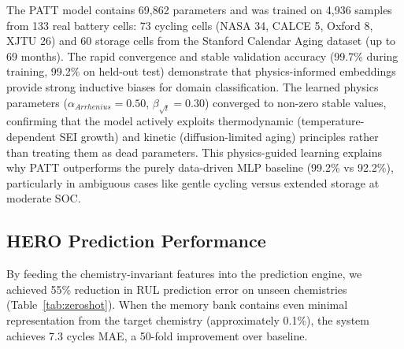 \documentclass[5p,times,authoryear]{elsarticle}
\begin{document}
The PATT model contains 69,862 parameters and was trained on 4,936 samples from 133 real battery cells: 73 cycling cells (NASA 34, CALCE 5, Oxford 8, XJTU 26) and 60 storage cells from the Stanford Calendar Aging dataset (up to 69 months). The rapid convergence and stable validation accuracy (99.7\% during training, 99.2\% on held-out test) demonstrate that physics-informed embeddings provide strong inductive biases for domain classification. The learned physics parameters ($\alpha_{Arrhenius} = 0.50$, $\beta_{\sqrt{t}} = 0.30$) converged to non-zero stable values, confirming that the model actively exploits thermodynamic (temperature-dependent SEI growth) and kinetic (diffusion-limited aging) principles rather than treating them as dead parameters. This physics-guided learning explains why PATT outperforms the purely data-driven MLP baseline (99.2\% vs 92.2\%), particularly in ambiguous cases like gentle cycling versus extended storage at moderate SOC.


\subsection{HERO Prediction Performance}

By feeding the chemistry-invariant features into the prediction engine, we achieved 55\% reduction in RUL prediction error on unseen chemistries (Table~\ref{tab:zeroshot}). When the memory bank contains even minimal representation from the target chemistry (approximately 0.1\%), the system achieves 7.3 cycles MAE, a 50-fold improvement over baseline.


\begin{table}[!htb]
\caption{Zero-Shot Generalization (Train: LCO, Test: NCM/NCA)}
\begin{center}
\end{center}
\label{tab:zeroshot}
\end{table}
\end{document}
